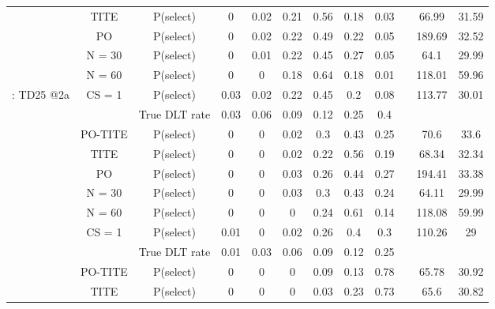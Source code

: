 \begin{table}
\begin{singlespace}
{\begin{tabular}[t]{cccccccccccc}
			& TITE & P(select) & 0 & 0.02 & 0.21 & 0.56 & 0.18 & 0.03 &  & 66.99 & 31.59\\
			
			& PO & P(select) & 0 & 0.02 & 0.22 & 0.49 & 0.22 & 0.05 &  & 189.69 & 32.52\\
			
			& N = 30 & P(select) & 0 & 0.01 & 0.22 & 0.45 & 0.27 & 0.05 &  & 64.1 & 29.99\\
			
			& N = 60 & P(select) & 0 & 0 & 0.18 & 0.64 & 0.18 & 0.01 &  & 118.01 & 59.96\\
			
			\multirow{-7}{*}{\centering\arraybackslash 4: TD25 @2a} & CS = 1 & P(select) & 0.03 & 0.02 & 0.22 & 0.45 & 0.2 & 0.08 &  & 113.77 & 30.01\\
			\cmidrule{1-12}
			\rowcolor{gray!6}   &  & True DLT rate & 0.03 & 0.06 & 0.09 & 0.12 & 0.25 & 0.4 &  &  & \\
			
			\rowcolor{gray!6}   & PO-TITE & P(select) & 0 & 0 & 0.02 & 0.3 & 0.43 & 0.25 &  & 70.6 & 33.6\\
			
			\rowcolor{gray!6}   & TITE & P(select) & 0 & 0 & 0.02 & 0.22 & 0.56 & 0.19 &  & 68.34 & 32.34\\
			
			\rowcolor{gray!6}   & PO & P(select) & 0 & 0 & 0.03 & 0.26 & 0.44 & 0.27 &  & 194.41 & 33.38\\
			
			\rowcolor{gray!6}   & N = 30 & P(select) & 0 & 0 & 0.03 & 0.3 & 0.43 & 0.24 &  & 64.11 & 29.99\\
			
			\rowcolor{gray!6}   & N = 60 & P(select) & 0 & 0 & 0 & 0.24 & 0.61 & 0.14 &  & 118.08 & 59.99\\
			
			\rowcolor{gray!6}  \multirow{-7}{*}{\centering\arraybackslash 5: TD25 @2b} & CS = 1 & P(select) & 0.01 & 0 & 0.02 & 0.26 & 0.4 & 0.3 &  & 110.26 & 29\\
			\cmidrule{1-12}
			&  & True DLT rate & 0.01 & 0.03 & 0.06 & 0.09 & 0.12 & 0.25 &  &  & \\
			
			& PO-TITE & P(select) & 0 & 0 & 0 & 0.09 & 0.13 & 0.78 &  & 65.78 & 30.92\\
			
			& TITE & P(select) & 0 & 0 & 0 & 0.03 & 0.23 & 0.73 &  & 65.6 & 30.82\\
			

\end{tabular}}
\end{singlespace}
\end{table}
